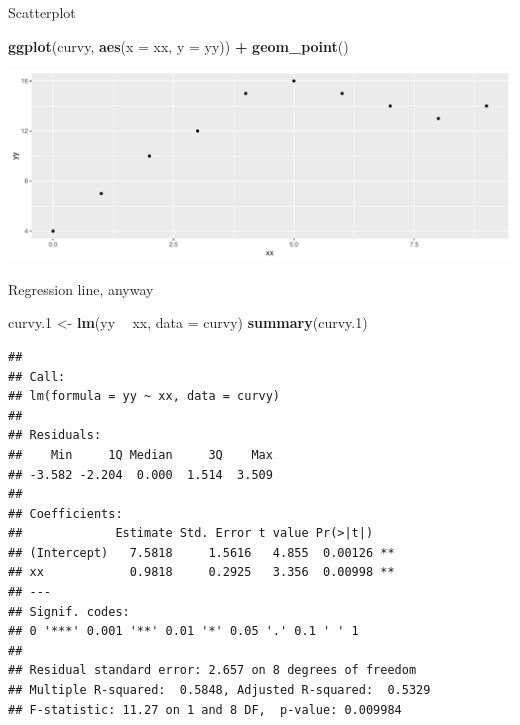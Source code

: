 \documentclass[
  ignorenonframetext,
]{beamer}
\newenvironment{Shaded}{\begin{snugshade}}{\end{snugshade}}
\newcommand{\DataTypeTok}[1]{\textcolor[rgb]{0.13,0.29,0.53}{#1}}
\newcommand{\FloatTok}[1]{\textcolor[rgb]{0.00,0.00,0.81}{#1}}
\newcommand{\KeywordTok}[1]{\textcolor[rgb]{0.13,0.29,0.53}{\textbf{#1}}}
\newcommand{\NormalTok}[1]{#1}
\newcommand{\OperatorTok}[1]{\textcolor[rgb]{0.81,0.36,0.00}{\textbf{#1}}}
\newcommand{\StringTok}[1]{\textcolor[rgb]{0.31,0.60,0.02}{#1}}
\begin{document}
\begin{frame}[fragile]{Scatterplot}
\protect\hypertarget{scatterplot}{}

\begin{Shaded}
\begin{Highlighting}[]
\KeywordTok{ggplot}\NormalTok{(curvy, }\KeywordTok{aes}\NormalTok{(}\DataTypeTok{x =}\NormalTok{ xx, }\DataTypeTok{y =}\NormalTok{ yy)) }\OperatorTok{+}\StringTok{ }\KeywordTok{geom_point}\NormalTok{()}
\end{Highlighting}
\end{Shaded}

\includegraphics{slides_d29_files/figure-beamer/unnamed-chunk-42-1.pdf}

\end{frame}

\begin{frame}[fragile]{Regression line, anyway}
\protect\hypertarget{regression-line-anyway}{}

\scriptsize

\begin{Shaded}
\begin{Highlighting}[]
\NormalTok{curvy}\FloatTok{.1}\NormalTok{ <-}\StringTok{ }\KeywordTok{lm}\NormalTok{(yy }\OperatorTok{~}\StringTok{ }\NormalTok{xx, }\DataTypeTok{data =}\NormalTok{ curvy)}
\KeywordTok{summary}\NormalTok{(curvy}\FloatTok{.1}\NormalTok{)}
\end{Highlighting}
\end{Shaded}

\begin{verbatim}
## 
## Call:
## lm(formula = yy ~ xx, data = curvy)
## 
## Residuals:
##    Min     1Q Median     3Q    Max 
## -3.582 -2.204  0.000  1.514  3.509 
## 
## Coefficients:
##             Estimate Std. Error t value Pr(>|t|)   
## (Intercept)   7.5818     1.5616   4.855  0.00126 **
## xx            0.9818     0.2925   3.356  0.00998 **
## ---
## Signif. codes:  
## 0 '***' 0.001 '**' 0.01 '*' 0.05 '.' 0.1 ' ' 1
## 
## Residual standard error: 2.657 on 8 degrees of freedom
## Multiple R-squared:  0.5848, Adjusted R-squared:  0.5329 
## F-statistic: 11.27 on 1 and 8 DF,  p-value: 0.009984
\end{verbatim}

\normalsize

\end{frame}
\end{document}
